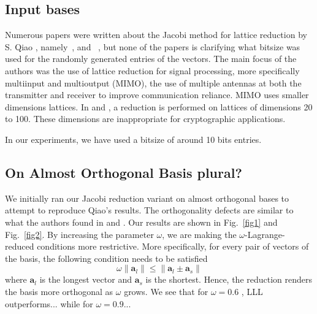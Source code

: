 \documentclass[10pt, a4paper]{article}
\newcommand{\my}[1]{{\color{blue} #1 }}
\renewcommand{\vec}[1]{\mathbf{#1}}
\begin{document}
\subsection{Input bases}
Numerous papers were written about the Jacobi method for lattice reduction by S. Qiao , namely~\cite{originalJacobiMethodLatticeBasisReduction}, \cite{complexityAnalysisOfJacobiMethod} and ~\cite{enhancedJacobi}, but none of the papers \my{is} clarifying what bitsize was used for the randomly generated entries of the vectors. The main focus of the authors was the use of lattice reduction for signal processing, more specifically multiinput and multioutput (MIMO), the use of multiple antennas at both the transmitter and receiver to improve communication reliance. MIMO uses smaller dimensions lattices. In \cite{enhancedJacobi} and \cite{tian2014hybrid}, a reduction is performed on lattices of dimensions 20 to 100. These dimensions are inappropriate for cryptographic applications.

In our experiments, we have used a bitsize of around 10 bits entries.

\subsection{On Almost Orthogonal Basis \my{plural?}}

We initially ran our Jacobi reduction variant on almost orthogonal bases to attempt to reproduce Qiao's results. The orthogonality defects are similar to what the authors found in \cite{tian2014hybrid} and \my{\cite{fastJacobi}}. Our results are shown in Fig.~\ref{fig1} and Fig.~\ref{fig2}. By increasing the parameter $\omega$, we are making the $\omega$-Lagrange-reduced conditions more restrictive. More specifically, for every pair of vectors of the basis, the following condition needs to be satisfied
\[
 \omega \| \vec{a}_l \| \leq \|\vec{a}_l \pm \vec{a}_s \|
\] where $\vec{a}_l$ is the longest vector and $\vec{a}_s$ is the shortest. Hence, the reduction renders the basis more orthogonal as $\omega$ grows. \my{We see that for $\omega=0.6$ , LLL outperforms... while for $\omega = 0.9$...}
\end{document}
